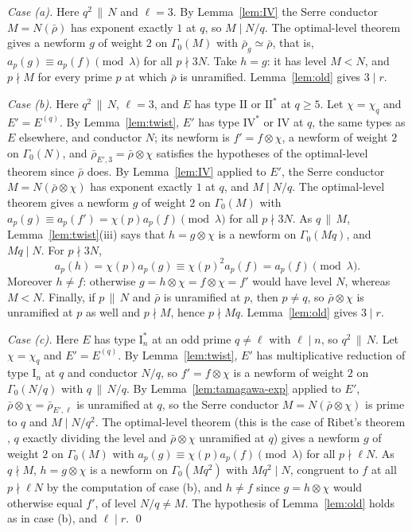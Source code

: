 \documentclass[11pt]{amsart}
\theoremstyle{definition}
\begin{document}
\medskip\noindent\emph{Case (a).} Here $q^2\,\|\,N$ and $\ell=3$. By Lemma~\ref{lem:IV} the Serre conductor $M=N(\bar\rho)$ has exponent exactly $1$ at $q$, so $M\mid N/q$. The optimal-level theorem gives a newform $g$ of weight $2$ on $\Gamma_0(M)$ with $\bar\rho_g\simeq\bar\rho$, that is, $a_p(g)\equiv a_p(f)\pmod\lambda$ for all $p\nmid 3N$. Take $h=g$: it has level $M<N$, and $p\nmid M$ for every prime $p$ at which $\bar\rho$ is unramified. Lemma~\ref{lem:old} gives $3\mid r$.

\medskip\noindent\emph{Case (b).} Here $q^2\,\|\,N$, $\ell=3$, and $E$ has type $\mathrm{II}$ or $\mathrm{II}^*$ at $q\ge5$. Let $\chi=\chi_q$ and $E'=E^{(q)}$. By Lemma~\ref{lem:twist}, $E'$ has type $\mathrm{IV}^*$ or $\mathrm{IV}$ at $q$, the same types as $E$ elsewhere, and conductor $N$; its newform is $f'=f\otimes\chi$, a newform of weight $2$ on $\Gamma_0(N)$, and $\bar\rho_{E',3}=\bar\rho\otimes\chi$ satisfies the hypotheses of the optimal-level theorem since $\bar\rho$ does. By Lemma~\ref{lem:IV} applied to $E'$, the Serre conductor $M=N(\bar\rho\otimes\chi)$ has exponent exactly $1$ at $q$, and $M\mid N/q$. The optimal-level theorem gives a newform $g$ of weight $2$ on $\Gamma_0(M)$ with $a_p(g)\equiv a_p(f')=\chi(p)a_p(f)\pmod\lambda$ for all $p\nmid 3N$. As $q\,\|\,M$, Lemma~\ref{lem:twist}(iii) says that $h=g\otimes\chi$ is a newform on $\Gamma_0(Mq)$, and $Mq\mid N$. For $p\nmid 3N$,
\[
a_p(h)=\chi(p)a_p(g)\equiv\chi(p)^2a_p(f)=a_p(f)\pmod\lambda .
\]
Moreover $h\ne f$: otherwise $g=h\otimes\chi=f\otimes\chi=f'$ would have level $N$, whereas $M<N$. Finally, if $p\,\|\,N$ and $\bar\rho$ is unramified at $p$, then $p\ne q$, so $\bar\rho\otimes\chi$ is unramified at $p$ as well and $p\nmid M$, hence $p\nmid Mq$. Lemma~\ref{lem:old} gives $3\mid r$.

\medskip\noindent\emph{Case (c).} Here $E$ has type $\mathrm{I}_n^*$ at an odd prime $q\ne\ell$ with $\ell\mid n$, so $q^2\,\|\,N$. Let $\chi=\chi_q$ and $E'=E^{(q)}$. By Lemma~\ref{lem:twist}, $E'$ has multiplicative reduction of type $\mathrm{I}_n$ at $q$ and conductor $N/q$, so $f'=f\otimes\chi$ is a newform of weight $2$ on $\Gamma_0(N/q)$ with $q\,\|\,N/q$. By Lemma~\ref{lem:tamagawa-exp} applied to $E'$, $\bar\rho\otimes\chi=\bar\rho_{E',\ell}$ is unramified at $q$, so the Serre conductor $M=N(\bar\rho\otimes\chi)$ is prime to $q$ and $M\mid N/q^2$. The optimal-level theorem (this is the case of Ribet's theorem \cite{Ribet90}, $q$ exactly dividing the level and $\bar\rho\otimes\chi$ unramified at $q$) gives a newform $g$ of weight $2$ on $\Gamma_0(M)$ with $a_p(g)\equiv\chi(p)a_p(f)\pmod\lambda$ for all $p\nmid\ell N$. As $q\nmid M$, $h=g\otimes\chi$ is a newform on $\Gamma_0(Mq^2)$ with $Mq^2\mid N$, congruent to $f$ at all $p\nmid\ell N$ by the computation of case (b), and $h\ne f$ since $g=h\otimes\chi$ would otherwise equal $f'$, of level $N/q\ne M$. The hypothesis of Lemma~\ref{lem:old} holds as in case (b), and $\ell\mid r$. \qed
\end{document}
